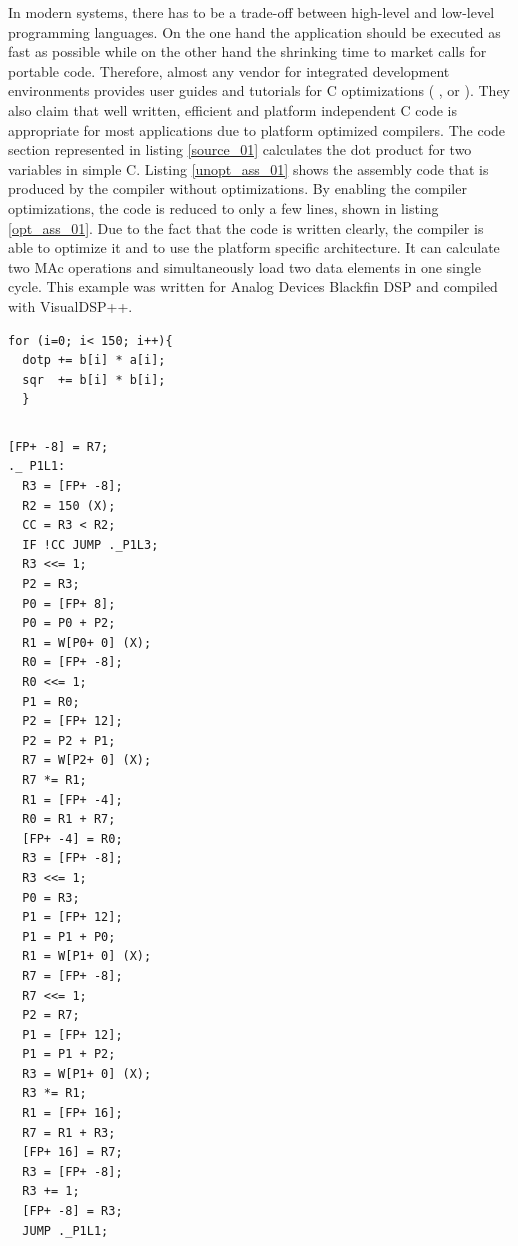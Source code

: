 In modern systems, there has to be a trade-off between high-level and low-level programming languages. On the one hand the application should be executed as fast as possible while on the other hand the shrinking time to market calls for portable code. Therefore, almost any vendor for integrated development environments provides user guides and tutorials for C optimizations ( \cite{anderson_optimizing_C}, \cite{ti_opt_C} or \cite{amd_opt_C}). They also claim that well written, efficient and platform independent C code is appropriate for most applications due to platform optimized compilers. The code section represented in listing \ref{source_01} calculates the dot product for two variables in simple C. Listing \ref{unopt_ass_01} shows the assembly code that is produced by the compiler without optimizations. By enabling the compiler optimizations, the code is reduced to only a few lines, shown in listing \ref{opt_ass_01}. Due to the fact that the code is written clearly, the compiler is able to optimize it and to use the platform specific architecture. It can calculate two \ac{MAc} operations and simultaneously load two data elements in one single cycle. This example was written for Analog Devices Blackfin DSP and compiled with VisualDSP++.


\begin{lstlisting}[columns=flexible,caption=Example code in C,label=source_01]
for (i=0; i< 150; i++){
  dotp += b[i] * a[i];
  sqr  += b[i] * b[i];
  }
\end{lstlisting}

\pagebreak

\begin{lstlisting}[caption = Unoptimized assembler code,abovecaptionskip = 0mm,belowcaptionskip = -5mm, label=unopt_ass_01]
\end{lstlisting}
\begin{multicols}{2}
\begin{lstlisting}[columns=flexible]
[FP+ -8] = R7;
._ P1L1:
  R3 = [FP+ -8];
  R2 = 150 (X);
  CC = R3 < R2;
  IF !CC JUMP ._P1L3;
  R3 <<= 1;
  P2 = R3;
  P0 = [FP+ 8];
  P0 = P0 + P2;
  R1 = W[P0+ 0] (X);
  R0 = [FP+ -8];
  R0 <<= 1;
  P1 = R0;
  P2 = [FP+ 12];
  P2 = P2 + P1;
  R7 = W[P2+ 0] (X);
  R7 *= R1;
  R1 = [FP+ -4];
  R0 = R1 + R7;
  [FP+ -4] = R0;
  R3 = [FP+ -8];
  R3 <<= 1;
  P0 = R3;
  P1 = [FP+ 12];
  P1 = P1 + P0;
  R1 = W[P1+ 0] (X);
  R7 = [FP+ -8];
  R7 <<= 1;
  P2 = R7;
  P1 = [FP+ 12];
  P1 = P1 + P2;
  R3 = W[P1+ 0] (X);
  R3 *= R1;
  R1 = [FP+ 16];
  R7 = R1 + R3;
  [FP+ 16] = R7;
  R3 = [FP+ -8];
  R3 += 1;
  [FP+ -8] = R3;
  JUMP ._P1L1;
\end{lstlisting}
\end{multicols}

